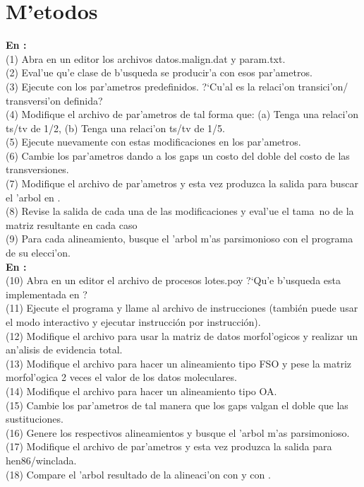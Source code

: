 \section{M'etodos}
\noindent
\textbf{En :}\\
(1) Abra en un editor los archivos datos.malign.dat y param.txt.\\
(2) Eval'ue qu'e clase de b'usqueda se producir'a con esos par'ametros.\\
(3) Ejecute  con los par'ametros predefinidos. ?`Cu'al es la relaci'on transici'on/ transversi'on definida?\\
(4) Modifique el archivo de par'ametros de tal forma que: 
 (a) Tenga una relaci'on ts/tv de 1/2,
 (b) Tenga una relaci'on ts/tv de 1/5.\\
(5) Ejecute nuevamente  con estas modificaciones en los par'ametros.\\
(6) Cambie los par'ametros dando a los gaps un costo del doble del costo de las transversiones.\\
(7) Modifique el archivo de par'ametros y esta vez produzca la salida para buscar el 'arbol en .\\
(8) Revise la salida de cada una de las modificaciones y eval'ue el tama~no de la matriz resultante en cada caso\\
(9) Para cada alineamiento, busque el 'arbol m'as parsimonioso con el programa de su elecci'on.\\
 \textbf{En :}\\
(10) Abra en un editor el archivo de procesos lotes.poy ?`Qu'e b'usqueda esta implementada en ?\\
(11) Ejecute el programa y llame al archivo de instrucciones (tambi\'en puede usar el modo interactivo y ejecutar instrucci\'on por  instrucci\'on).\\
(12) Modifique el archivo para usar la matriz de datos morfol'ogicos y realizar un an'alisis de evidencia total.\\
(13) Modifique el archivo para hacer un alineamiento tipo FSO y pese la matriz morfol'ogica 2 veces el valor de los datos
 moleculares.\\
(14) Modifique el archivo para hacer un alineamiento tipo OA.\\
(15) Cambie los par'ametros de tal manera que los gaps valgan el doble que las sustituciones.\\
(16) Genere los respectivos alineamientos y busque el 'arbol m'as parsimonioso.\\
(17) Modifique el archivo de par'ametros y esta vez produzca la salida para hen86/winclada.\\
(18) Compare el 'arbol resultado de la alineaci'on con  y con .
